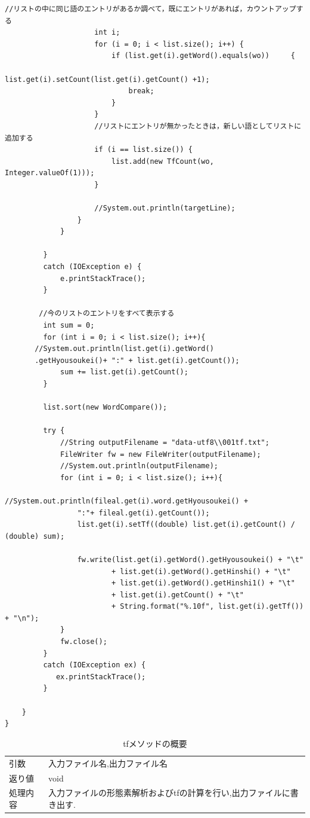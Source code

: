 \documentclass[a4j]{jarticle}
\begin{document}
\begin{lstlisting}[basicstyle=\ttfamily\footnotesize, frame=single,label=TermFrequencyClass,caption=TermFrequencyクラスのソースコード]
					//リストの中に同じ語のエントリがあるか調べて，既にエントリがあれば，カウントアップする
					 int i;
					 for (i = 0; i < list.size(); i++) {
						 if (list.get(i).getWord().equals(wo))     {
							 list.get(i).setCount(list.get(i).getCount() +1);
							 break;
						 }
					 }
					 //リストにエントリが無かったときは，新しい語としてリストに追加する
					 if (i == list.size()) {
						 list.add(new TfCount(wo, Integer.valueOf(1)));
					 }

					 //System.out.println(targetLine);
				 }
			 }

		 }
		 catch (IOException e) {
			 e.printStackTrace();
		 }

		//今のリストのエントリをすべて表示する
		 int sum = 0;
		 for (int i = 0; i < list.size(); i++){
       //System.out.println(list.get(i).getWord()
       .getHyousoukei()+ ":" + list.get(i).getCount());
			 sum += list.get(i).getCount();
		 }

		 list.sort(new WordCompare());

		 try {
			 //String outputFilename = "data-utf8\\001tf.txt";
			 FileWriter fw = new FileWriter(outputFilename);
			 //System.out.println(outputFilename);
			 for (int i = 0; i < list.size(); i++){
				 //System.out.println(fileal.get(i).word.getHyousoukei() + 
				 ":"+ fileal.get(i).getCount());
				 list.get(i).setTf((double) list.get(i).getCount() / (double) sum);

				 fw.write(list.get(i).getWord().getHyousoukei() + "\t"
						 + list.get(i).getWord().getHinshi() + "\t"
						 + list.get(i).getWord().getHinshi1() + "\t"
						 + list.get(i).getCount() + "\t"
						 + String.format("%.10f", list.get(i).getTf()) + "\n");
			 }
			 fw.close();
		 }
		 catch (IOException ex) {
			ex.printStackTrace();
		 }

	}
}
          \end{lstlisting}

\begin{table}[H]
  \caption{tfメソッドの概要}
  \label{tfc}
  \begin{center}
      \begin{tabular}{l|l}\hline
        引数 & 入力ファイル名,出力ファイル名 \\ 
        返り値 & void \\ 
        処理内容 & 入力ファイルの形態素解析およびtfの計算を行い,出力ファイルに書き出す. \\ \hline
      \end{tabular}
  \end{center}
  \end{table}
\end{document}
